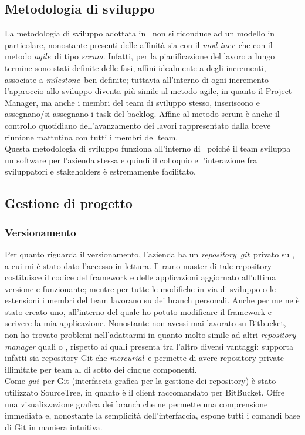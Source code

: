    \subsection{Metodologia di sviluppo}
    La metodologia di sviluppo adottata in \TS\ non si riconduce ad un modello in particolare, nonostante presenti delle affinità sia con il \emph{\gls{mod-incr}}\glsfirstoccur\ che con il metodo \emph{\gls{agile}}\glsfirstoccur\ di tipo \emph{\gls{scrum}}\glsfirstoccur. Infatti, per la pianificazione del lavoro a lungo termine sono stati definite delle fasi, affini idealmente a degli incrementi, associate a \emph{\gls{milestone}}\glsfirstoccur\ ben definite; tuttavia all'interno di ogni incremento l'approccio allo sviluppo diventa più simile al metodo agile, in quanto il Project Manager, ma anche i membri del team di sviluppo stesso,  inseriscono e assegnano/si assegnano i task del backlog. Affine al metodo scrum è anche il controllo quotidiano dell'avanzamento dei lavori rappresentato dalla breve riunione mattutina con tutti i membri del team. \\
    Questa metodologia di sviluppo funziona all'interno di \TS\ poiché il team sviluppa un software per l'azienda stessa e quindi il colloquio e l'interazione fra sviluppatori e stakeholders è estremamente facilitato.

    \subsection{Gestione di progetto}
        \subsubsection{Versionamento}
        Per quanto riguarda il versionamento, l'azienda ha un \emph{\gls{repository}}\glsfirstoccur\ \emph{\gls{git}}\glsfirstoccur\ privato su , a cui mi è stato dato l'accesso in lettura. Il ramo master di tale repository costituisce il codice del framework e delle applicazioni aggiornato all'ultima versione e funzionante; mentre per tutte le modifiche in via di sviluppo o le estensioni i membri del team lavorano su dei branch personali. Anche per me ne è stato creato uno, all'interno del quale ho potuto modificare il framework e scrivere la mia applicazione. Nonostante non avessi mai lavorato su Bitbucket, non ho trovato problemi nell'adattarmi in quanto molto simile ad altri \textit{repository manager} quali  o , rispetto ai quali presenta tra l'altro diversi vantaggi: supporta infatti sia repository Git che \emph{\gls{mercurial}}\glsfirstoccur\ e permette di avere repository private illimitate per team al di sotto dei cinque componenti. \\
        Come \emph{\gls{gui}}\glsfirstoccur\ per Git (interfaccia grafica per la gestione dei repository) è stato utilizzato SourceTree, in quanto è il client raccomandato per BitBucket. Offre una visualizzazione grafica dei branch che ne permette una comprensione immediata e, nonostante la semplicità dell'interfaccia, espone tutti i comandi base di Git in maniera intuitiva.
        
